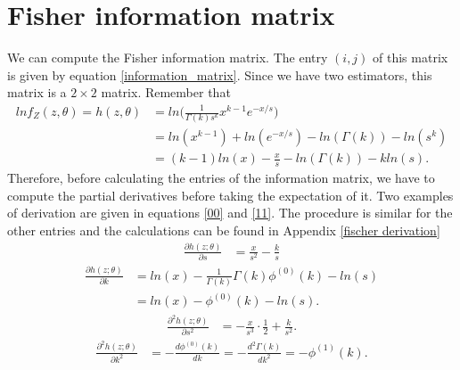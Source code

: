\documentclass[final]{aomart}
\newtheorem[{}\it]{thm}{Theorem}[section]
\theoremstyle{definition}
\newtheorem*[{}\it]{notation}{Notation}
\numberwithin{equation}{section}
\begin{document}
\section{Fisher information matrix}
We can compute the Fisher information matrix. The entry $(i,j)$ of this matrix is given by equation \ref{information_matrix}. Since we have two estimators, this matrix is a $2\times 2$ matrix. Remember that
\begin{equation}
	\begin{aligned}
	lnf_Z(z,\theta) = h(z,\theta) & = ln\bigg( \frac{1}{\Gamma(k)s^k}x^{k-1}e^{-x/s} \bigg)\\
						   & = ln(x^{k-1}) + ln(e^{-x/s}) - ln(\Gamma(k)) - ln(s^k)\\
						   & = (k-1)ln(x) - \frac{x}{s} - ln(\Gamma(k)) - kln(s).
	\end{aligned}
\end{equation}
Therefore, before calculating the entries of the information matrix, we have to compute the partial derivatives before taking the expectation of it. Two examples of derivation are given in equations \ref{00} and \ref{11}. The procedure is similar for the other entries and the calculations can be found in Appendix \ref{fischer derivation}
\begin{equation}
	\begin{aligned}
	\frac{\partial h(z;\theta)}{\partial s} & = \frac{x}{s^2} - \frac{k}{s}
	\end{aligned}
\end{equation}
\begin{equation}
	\begin{aligned}
	\frac{\partial h(z;\theta)}{\partial k} & = ln(x) - \frac{1}{\Gamma(k)}\Gamma(k)\phi^{(0)}(k) - ln(s)\\
														  & = ln(x) - \phi^{(0)}(k) - ln(s).
	\end{aligned}
\end{equation}
\begin{equation}
	\begin{aligned}
	\frac{\partial^2h(z;\theta)}{\partial s^2} & = -\frac{x}{s^3}\cdot\frac{1}{2} + \frac{k}{s^2}.
	\end{aligned}
	\label{00}
\end{equation}
\begin{equation}
	\begin{aligned}
	\frac{\partial^2 h(z; \theta)}{\partial k^2} & = -\frac{d\phi^{(0)}(k)}{dk} = -\frac{d^2\Gamma(k)}{dk^2} = -\phi^{(1)}(k).
	\end{aligned}
	\label{11}
\end{equation}
\end{document}
